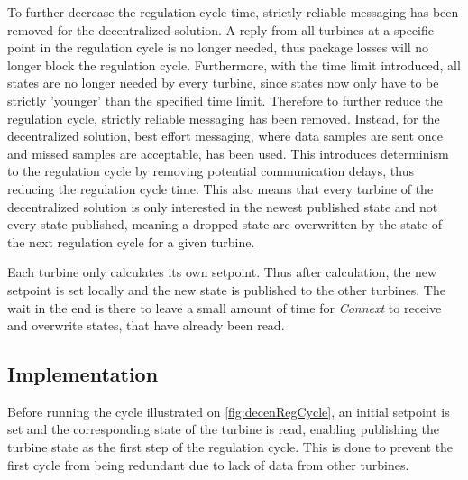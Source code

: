 To further decrease the regulation cycle time, strictly reliable messaging has been removed for the decentralized solution. A reply from all turbines at a specific point in the regulation cycle is no longer needed, thus package losses will no longer block the regulation cycle. Furthermore, with the time limit introduced, all states are no longer needed by every turbine, since states now only have to be strictly 'younger' than the specified time limit. Therefore to further reduce the regulation cycle, strictly reliable messaging has been removed. Instead, for the decentralized solution, best effort messaging, where data samples are sent once and missed samples are acceptable, has been used. This introduces determinism to the regulation cycle by removing potential communication delays, thus reducing the regulation cycle time. This also means that every turbine of the decentralized solution is only interested in the newest published state and not every state published, meaning a dropped state are overwritten by the state of the next regulation cycle for a given turbine.

Each turbine only calculates its own setpoint. Thus after calculation, the new setpoint is set locally and the new state is published to the other turbines. The wait in the end is there to leave a small amount of time for \textit{Connext} to receive and overwrite states, that have already been read.

\subsection{Implementation}

Before running the cycle illustrated on \cref{fig:decenRegCycle}, an initial setpoint is set and the corresponding state of the turbine is read, enabling publishing the turbine state as the first step of the regulation cycle. This is done to prevent the first cycle from being redundant due to lack of data from other turbines. 

